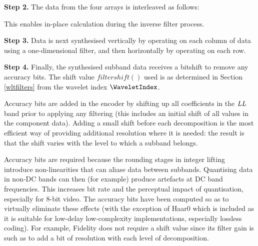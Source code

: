 {\bf Step 2.} The data from the four arrays is interleaved as follows:

\begin{pseudo*}
    \bsEND
\bsEND
\bsCODE{\hdots}
\end{pseudo*}

This enables in-place calculation during the inverse filter process.

{\bf Step 3.} Data is next synthesised vertically by operating on each column
of data using a one-dimensional filter, and then horizontally by operating
on each row.

\begin{pseudo*}
\bsEND
{}
\bsEND
\bsCODE{\hdots}
\end{pseudo*}

{\bf Step 4.} Finally, the synthesised subband data receives a bitshift to
remove any accuracy bits. The shift value $filtershift()$ used is as determined in Section \ref{wltfilters}
from the wavelet index $\WaveletIndex$.

\begin{pseudo*}
    \bsEND
\bsEND
\end{pseudo*}

\begin{informative}
Accuracy bits are added in the encoder by shifting up all coefficients in the 
$\textit{LL}$ band prior to applying any filtering (this includes an initial shift of all 
values in the component data). Adding a small shift before each decomposition
is the most efficient way of providing additional resolution where it is needed:
the result is that the shift varies with the level to which a subband belongs.

Accuracy bits are required because the rounding stages in integer lifting
introduce non-linearities that can aliase data between subbands. Quantising
data in non-DC bands can then (for example) produce artefacts at DC 
band frequencies. This increases bit rate and the perceptual impact of quantisation, 
especially for 8-bit video. The accuracy bits have been computed so as to virtually
eliminate these effects (with the exception of Haar0 which is included as it
is suitable for low-delay low-complexity implementations, especially lossless coding).
For example, Fidelity does not require a shift value since its filter gain is such
as to add a bit of resolution with each level of decomposition.
\end{informative}

